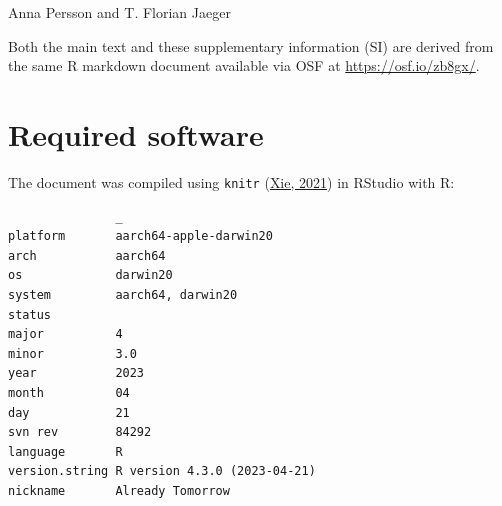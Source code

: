\documentclass[utf8]{frontiers_suppmat} %
\begin{document}
\onecolumn
{}

\title {{}}

\maketitle
\begin{center}Anna Persson and T. Florian Jaeger\end{center}

Both the main text and these supplementary information (SI) are derived from the same R markdown document available via OSF at \url{https://osf.io/zb8gx/}.

\setcounter{section}{0}
\setcounter{footnote}{0}
\setcounter{figure}{0}
\setcounter{table}{0}
\setcounter{equation}{0}
\renewcommand{\thefootnote}{S\arabic{footnote}}
\renewcommand{\thefigure}{S\arabic{figure}}
\renewcommand{\thetable}{S\arabic{table}}
\renewcommand{\theequation}{S\arabic{equation}}

\hypertarget{sec:SI-software}{%
\section{Required software}\label{sec:SI-software}}

The document was compiled using \texttt{knitr} (\protect\hyperlink{ref-xie2021}{Xie, 2021}) in RStudio with R:

\begin{verbatim}
               _                           
platform       aarch64-apple-darwin20      
arch           aarch64                     
os             darwin20                    
system         aarch64, darwin20           
status                                     
major          4                           
minor          3.0                         
year           2023                        
month          04                          
day            21                          
svn rev        84292                       
language       R                           
version.string R version 4.3.0 (2023-04-21)
nickname       Already Tomorrow            
\end{verbatim}
\end{document}
